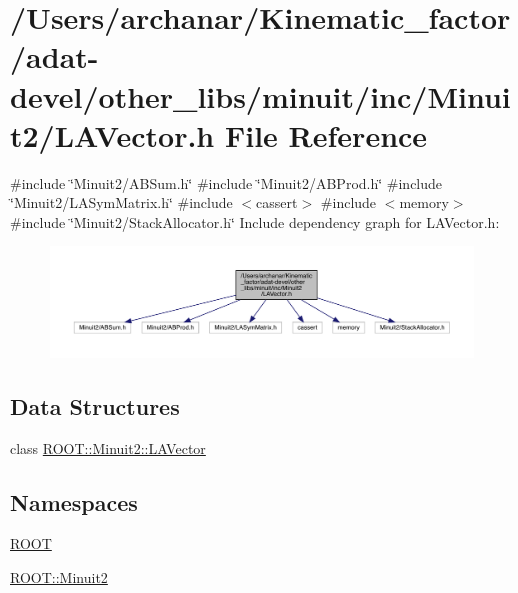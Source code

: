 \hypertarget{adat-devel_2other__libs_2minuit_2inc_2Minuit2_2LAVector_8h}{}\section{/\+Users/archanar/\+Kinematic\+\_\+factor/adat-\/devel/other\+\_\+libs/minuit/inc/\+Minuit2/\+L\+A\+Vector.h File Reference}
\label{adat-devel_2other__libs_2minuit_2inc_2Minuit2_2LAVector_8h}
{\ttfamily \#include \char`\"{}Minuit2/\+A\+B\+Sum.\+h\char`\"{}}\newline
{\ttfamily \#include \char`\"{}Minuit2/\+A\+B\+Prod.\+h\char`\"{}}\newline
{\ttfamily \#include \char`\"{}Minuit2/\+L\+A\+Sym\+Matrix.\+h\char`\"{}}\newline
{\ttfamily \#include $<$cassert$>$}\newline
{\ttfamily \#include $<$memory$>$}\newline
{\ttfamily \#include \char`\"{}Minuit2/\+Stack\+Allocator.\+h\char`\"{}}\newline
Include dependency graph for L\+A\+Vector.\+h\+:
\nopagebreak
\begin{figure}[H]
\begin{center}
\leavevmode
\includegraphics[width=350pt]{d3/d87/adat-devel_2other__libs_2minuit_2inc_2Minuit2_2LAVector_8h__incl}
\end{center}
\end{figure}
\subsection*{Data Structures}
\begin{DoxyCompactItemize}
\item 
class \mbox{\hyperlink{classROOT_1_1Minuit2_1_1LAVector}{R\+O\+O\+T\+::\+Minuit2\+::\+L\+A\+Vector}}
\end{DoxyCompactItemize}
\subsection*{Namespaces}
\begin{DoxyCompactItemize}
\item 
 \mbox{\hyperlink{namespaceROOT}{R\+O\+OT}}
\item 
 \mbox{\hyperlink{namespaceROOT_1_1Minuit2}{R\+O\+O\+T\+::\+Minuit2}}
\end{DoxyCompactItemize}
